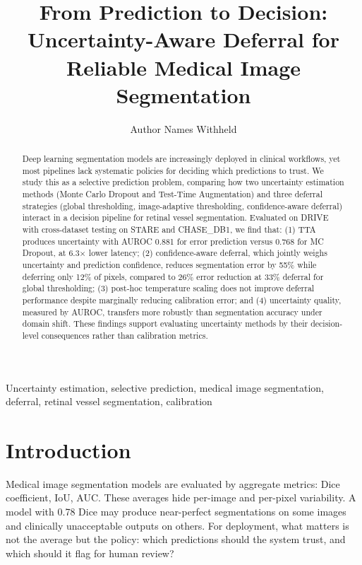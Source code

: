 \documentclass[journal]{IEEEtran}
\begin{document}
\title{From Prediction to Decision: Uncertainty-Aware Deferral for Reliable
Medical Image Segmentation}

\author{Author Names Withheld}

\maketitle

\begin{abstract}
Deep learning segmentation models are increasingly deployed in clinical
workflows, yet most pipelines lack systematic policies for deciding which
predictions to trust. We study this as a selective prediction problem,
comparing how two uncertainty estimation methods (Monte Carlo Dropout and
Test-Time Augmentation) and three deferral strategies (global thresholding,
image-adaptive thresholding, confidence-aware deferral) interact in a decision
pipeline for retinal vessel segmentation. Evaluated on DRIVE with cross-dataset
testing on STARE and CHASE\_DB1, we find that: (1) TTA produces uncertainty with
AUROC 0.881 for error prediction versus 0.768 for MC Dropout, at 6.3$\times$
lower latency; (2) confidence-aware deferral, which jointly weighs uncertainty
and prediction confidence, reduces segmentation error by 55\% while deferring
only 12\% of pixels, compared to 26\% error reduction at 33\% deferral for
global thresholding; (3) post-hoc temperature scaling does not improve deferral
performance despite marginally reducing calibration error; and (4) uncertainty
quality, measured by AUROC, transfers more robustly than segmentation accuracy
under domain shift. These findings support evaluating uncertainty methods by
their decision-level consequences rather than calibration metrics.
\end{abstract}

\begin{IEEEkeywords}
Uncertainty estimation, selective prediction, medical image segmentation,
deferral, retinal vessel segmentation, calibration
\end{IEEEkeywords}

\section{Introduction}

Medical image segmentation models are evaluated by aggregate metrics: Dice
coefficient, IoU, AUC. These averages hide per-image and per-pixel variability.
A model with 0.78 Dice may produce near-perfect segmentations on some images
and clinically unacceptable outputs on others. For deployment, what matters is
not the average but the policy: which predictions should the system trust, and
which should it flag for human review?
\end{document}
